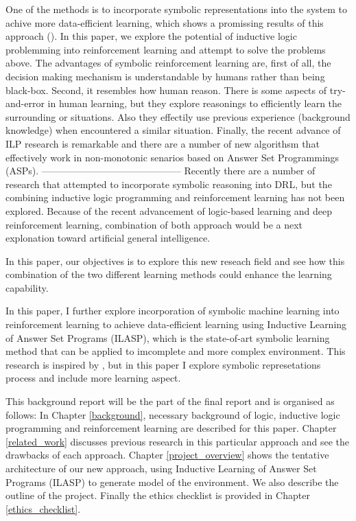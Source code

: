 \documentclass[12pt,twoside]{report}
\begin{document}
One of the methods is to incorporate symbolic representations into the system to achive more data-efficient learning, which shows a promissing results of this approach (\cite{Garnelo2016}).
In this paper, we explore the potential of inductive logic problemming into reinforcement learning and attempt to solve the problems above.
The advantages of symbolic reinforcement learning are, first of all, the decision making mechanism is understandable by humans rather than being black-box.
Second, it resembles how human reason. There is some aspects of try-and-error in human learning, but they explore reasonings to efficiently learn the surrounding or situations.
Also they effectily use previous experience (background knowledge) when encountered a similar situation.
Finally, the recent advance of ILP research is remarkable and there are a number of new algorithsm that effectively work in non-monotonic senarios based on Answer Set Programmings (ASPs).
--------------------------------------------
Recently there are a number of research that attempted to incorporate symbolic reasoning into DRL, but the combining inductive logic programming and reinforcement learning has not been explored.
Because of the recent advancement of logic-based learning and deep reinforcement learning, combination of both approach would be a next explonation toward artificial general intelligence.

In this paper, our objectives is to explore this new reseach field and see how this combination of the two different learning methods could enhance the learning capability.

In this paper, I further explore incorporation of symbolic machine learning into reinforcement learning to achieve data-efficient learning using Inductive Learning of Answer Set Programs (ILASP), which is the state-of-art symbolic learning method that can be applied to imcomplete and more complex environment.
This research is inspired by \cite{Garnelo2016}, but in this paper I explore symbolic represetations process and include more learning aspect.

This background report will be the part of the final report and is organised as follows: In Chapter \ref{background}, necessary background of logic, inductive logic programming and reinforcement learning are described for this paper. Chapter \ref{related_work} discusses previous research in this particular approach and see the drawbacks of each approach. Chapter \ref{project_overview} shows the tentative architecture of our new approach, using Inductive Learning of Answer Set Programs (ILASP) to generate model of the environment. We also describe the outline of the project. Finally the ethics checklist is provided in Chapter \ref{ethics_checklist}.
\end{document}
